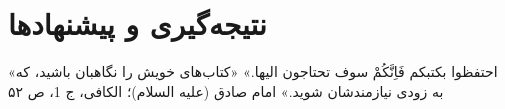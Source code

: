 \chapter{نتیجه‌گیری و پیشنهادها‍}
\label{ch6}
\bottomquote
{«احتفظوا بکتبکم فَاِنَّکُمْ سوف تحتاجون الیها.»}
{«کتاب‌های خویش را نگاهبان باشید، که به زودی نیازمندشان شوید.»}
{امام صادق (علیه السلام)؛ الکافی، ج 1، ص ۵۲}
\clearpage





\clearpage

